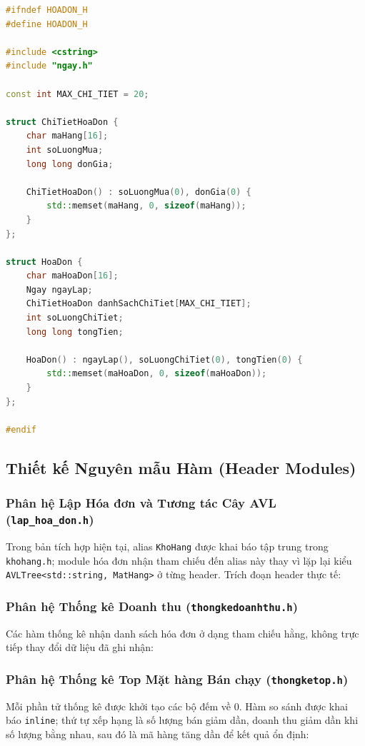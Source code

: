 \begin{lstlisting}[language=C++, caption={Cấu trúc Dữ liệu Hóa đơn và Chi tiết (hoadon.h)}]
#ifndef HOADON_H
#define HOADON_H

#include <cstring>
#include "ngay.h"

const int MAX_CHI_TIET = 20;

struct ChiTietHoaDon {
    char maHang[16];
    int soLuongMua;
    long long donGia;

    ChiTietHoaDon() : soLuongMua(0), donGia(0) {
        std::memset(maHang, 0, sizeof(maHang));
    }
};

struct HoaDon {
    char maHoaDon[16];
    Ngay ngayLap;
    ChiTietHoaDon danhSachChiTiet[MAX_CHI_TIET];
    int soLuongChiTiet;
    long long tongTien;

    HoaDon() : ngayLap(), soLuongChiTiet(0), tongTien(0) {
        std::memset(maHoaDon, 0, sizeof(maHoaDon));
    }
};

#endif
\end{lstlisting}

\subsection{Thiết kế Nguyên mẫu Hàm (Header Modules)}

\subsubsection{Phân hệ Lập Hóa đơn và Tương tác Cây AVL (\texttt{lap\_hoa\_don.h})}
Trong bản tích hợp hiện tại, alias \texttt{KhoHang} được khai báo tập trung trong \texttt{khohang.h}; module hóa đơn nhận tham chiếu đến alias này thay vì lặp lại kiểu \texttt{AVLTree<std::string, MatHang>} ở từng header. Trích đoạn header thực tế:


\subsubsection{Phân hệ Thống kê Doanh thu (\texttt{thongkedoanhthu.h})}
Các hàm thống kê nhận danh sách hóa đơn ở dạng tham chiếu hằng, không trực tiếp thay đổi dữ liệu đã ghi nhận:


\subsubsection{Phân hệ Thống kê Top Mặt hàng Bán chạy (\texttt{thongketop.h})}
Mỗi phần tử thống kê được khởi tạo các bộ đếm về 0. Hàm so sánh được khai báo \texttt{inline}; thứ tự xếp hạng là số lượng bán giảm dần, doanh thu giảm dần khi số lượng bằng nhau, sau đó là mã hàng tăng dần để kết quả ổn định:



